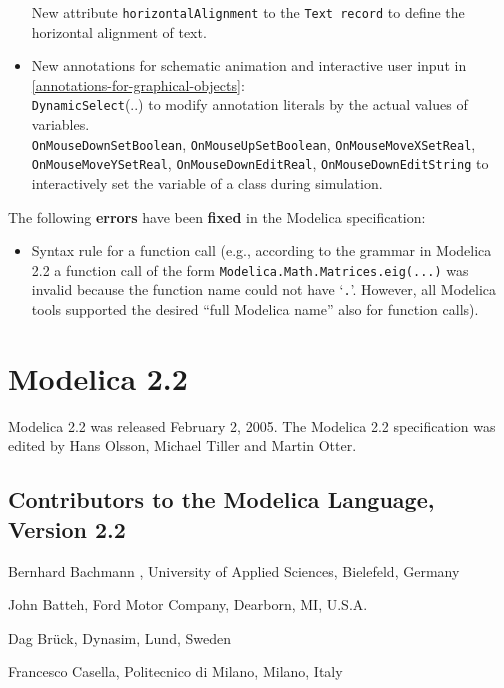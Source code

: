 \begin{itemize}
  New attribute \lstinline!horizontalAlignment! to the \lstinline!Text record! to define the
  horizontal alignment of text.
\item
  New annotations for schematic animation and interactive user input in
  \autoref{annotations-for-graphical-objects}:\\
  \lstinline!DynamicSelect!(..) to modify annotation literals by the actual values
  of variables.\\
  \lstinline!OnMouseDownSetBoolean!, \lstinline!OnMouseUpSetBoolean!, \lstinline!OnMouseMoveXSetReal!,
  \lstinline!OnMouseMoveYSetReal!, \lstinline!OnMouseDownEditReal!, \lstinline!OnMouseDownEditString! to
  interactively set the variable of a class during simulation.
\end{itemize}

The following \textbf{errors} have been \textbf{fixed} in the Modelica
specification:

\begin{itemize}
\item
  Syntax rule for a function call (e.g., according to the grammar in
  Modelica 2.2 a function call of the form
  \lstinline!Modelica.Math.Matrices.eig(...)! was invalid because the function name
  could not have `\lstinline!.!'. However, all Modelica tools supported the
  desired ``full Modelica name'' also for function calls).
\end{itemize}

\section{Modelica 2.2}

Modelica 2.2 was released February 2, 2005. The Modelica 2.2
specification was edited by Hans Olsson, Michael Tiller and Martin
Otter.

\subsection{Contributors to the Modelica Language, Version 2.2}
\indent\indent
Bernhard Bachmann , University of Applied Sciences, Bielefeld, Germany

John Batteh, Ford Motor Company, Dearborn, MI, U.S.A.

Dag Brück, Dynasim, Lund, Sweden

Francesco Casella, Politecnico di Milano, Milano, Italy

